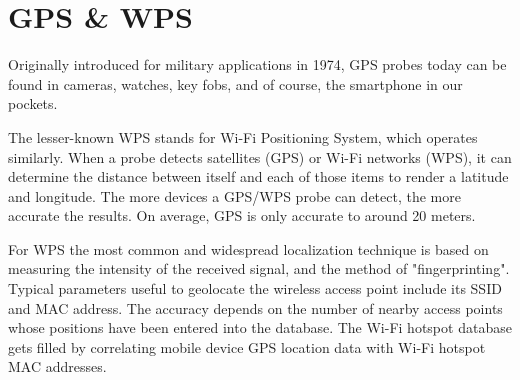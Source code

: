 \section{GPS \& WPS}

Originally introduced for military applications in 1974, GPS probes today can be
found in cameras, watches, key fobs, and of course, the smartphone in our
pockets.

The lesser-known WPS stands for Wi-Fi Positioning System, which operates
similarly. When a probe detects satellites (GPS) or Wi-Fi networks (WPS), it can
determine the distance between itself and each of those items to render a
latitude and longitude. The more devices a GPS/WPS probe can detect, the more
accurate the results. On average, GPS is only accurate to around 20 meters.

For WPS the most common and widespread localization technique is based on
measuring the intensity of the received signal, and the method of
"fingerprinting". Typical parameters useful to geolocate the wireless access
point include its SSID and MAC address. The accuracy depends on the number of
nearby access points whose positions have been entered into the database. The
Wi-Fi hotspot database gets filled by correlating mobile device GPS location
data with Wi-Fi hotspot MAC addresses.